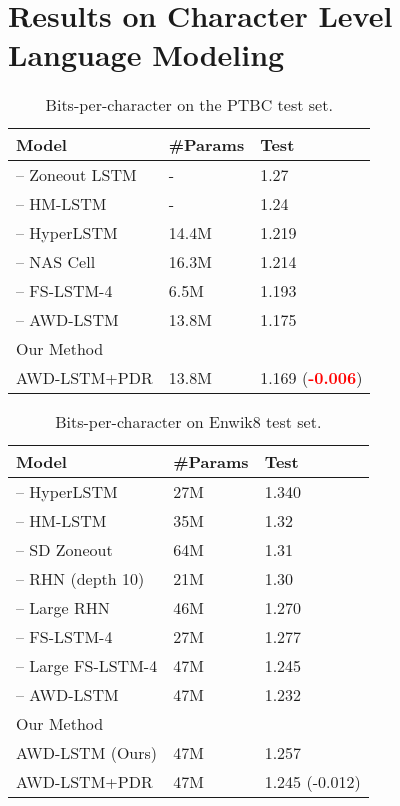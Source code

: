 \documentclass{article} \usepackage{iclr2019_conference,times}
\begin{document}
\section{Results on Character Level Language Modeling}
\begin{table}[t]
\centering
\begin{tabular}{lll}
\toprule
\textbf{Model} & \textbf{\#Params} &  \textbf{Test} \\
\midrule
\cite{Krueger2016ZoneoutRR} -- Zoneout LSTM & - & 1.27 \\
\cite{Chung2016HierarchicalMR} -- HM-LSTM & - & 1.24 \\
\cite{Ha2016HyperNetworks} -- HyperLSTM & 14.4M &  1.219 \\
\cite{Zoph2016NeuralAS} -- NAS Cell & 16.3M & 1.214 \\
\cite{Mujika2017FastSlowRN}  -- FS-LSTM-4 &   6.5M & 1.193 \\
 \cite{Merity2018AnAO}  -- AWD-LSTM & 13.8M &  1.175 \\
\midrule
Our Method\\
\midrule
AWD-LSTM+PDR  & 13.8M & 1.169 (\textcolor{red}{\textbf{-0.006}}) \\
\toprule
\end{tabular}
\caption{Bits-per-character on the PTBC test set.} \label{tab:pennchar_res}
\end{table}
\begin{table}[t]
\centering
\begin{tabular}{lll}
\toprule
\textbf{Model} & \textbf{\#Params} &  \textbf{Test} \\
\midrule
\cite{Ha2016HyperNetworks} --  HyperLSTM & 27M & 1.340 \\
\cite{Chung2016HierarchicalMR} -- HM-LSTM & 35M & 1.32 \\
\cite{Rocki2016SurprisalDrivenZ} -- SD Zoneout & 64M & 1.31 \\
\cite{Zilly2017RecurrentHN} -- RHN (depth 10) & 21M & 1.30 \\
\cite{Zilly2017RecurrentHN} -- Large RHN  & 46M & 1.270 \\
\cite{Mujika2017FastSlowRN}  -- FS-LSTM-4 & 27M & 1.277 \\
\cite{Mujika2017FastSlowRN} -- Large FS-LSTM-4 &   47M & 1.245\\
 \cite{Merity2018AnAO}  -- AWD-LSTM & 47M &  1.232 \\
\midrule
Our Method\\
\midrule
AWD-LSTM (Ours) & 47M & 1.257 \\
 AWD-LSTM+PDR  & 47M & 1.245 (-0.012)\\
\toprule
\end{tabular}
\caption{Bits-per-character on Enwik8 test set.}\label{tab:enwik8_res}
\end{table}
\end{document}
